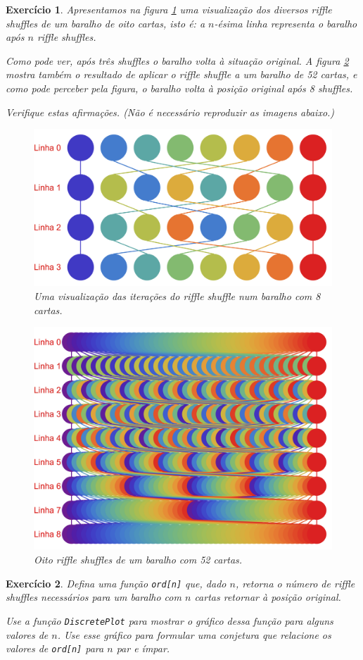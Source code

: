 \documentclass{article}
\newtheorem{ex}{Exercício}[section]
\begin{document}
\begin{ex}
Apresentamos na figura \ref{shuffle8} uma visualização dos diversos riffle shuffles de um baralho de oito cartas, isto é: a $n$-ésima linha representa o baralho após $n$ riffle shuffles.

Como pode ver, após três shuffles o baralho volta à situação original. A figura \ref{shuffle52} mostra também o resultado de aplicar o riffle shuffle a um baralho de 52 cartas, e como pode perceber pela figura, o baralho volta à posição original após 8 shuffles.

Verifique estas afirmações. (Não é necessário reproduzir as imagens abaixo.)

\begin{figure}[H]
\centering
\includegraphics[width=.75\textwidth]{shuffle8}
\caption{Uma visualização das iterações do riffle shuffle num baralho com 8 cartas.}\label{shuffle8}
\end{figure}

\begin{figure}[H]
\centering
\includegraphics[width=.75\textwidth]{shuffle52}
\caption{Oito riffle shuffles de um baralho com 52 cartas.}\label{shuffle52}
\end{figure}
\end{ex}

\begin{ex}
Defina uma função \texttt{ord[n]} que, dado $n$, retorna o número de riffle shuffles necessários para um baralho com $n$ cartas retornar à posição original.

Use a função \texttt{DiscretePlot} para mostrar o gráfico dessa função para alguns valores de $n$. Use esse gráfico para formular uma conjetura que relacione os valores de \texttt{ord[n]} para $n$ par e ímpar.
\end{ex}
\end{document}
